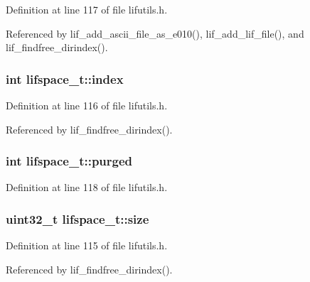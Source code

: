 Definition at line 117 of file lifutils.\+h.



Referenced by lif\+\_\+add\+\_\+ascii\+\_\+file\+\_\+as\+\_\+e010(), lif\+\_\+add\+\_\+lif\+\_\+file(), and lif\+\_\+findfree\+\_\+dirindex().

\subsubsection[{\texorpdfstring{index}{index}}]{\setlength{\rightskip}{0pt plus 5cm}int lifspace\+\_\+t\+::index}\hypertarget{structlifspace__t_abcca3daca009eca56173dc8577d597da}{}\label{structlifspace__t_abcca3daca009eca56173dc8577d597da}


Definition at line 116 of file lifutils.\+h.



Referenced by lif\+\_\+findfree\+\_\+dirindex().

\subsubsection[{\texorpdfstring{purged}{purged}}]{\setlength{\rightskip}{0pt plus 5cm}int lifspace\+\_\+t\+::purged}\hypertarget{structlifspace__t_a53fce276ffb7bb4f8556cc2e7ac76390}{}\label{structlifspace__t_a53fce276ffb7bb4f8556cc2e7ac76390}


Definition at line 118 of file lifutils.\+h.

\subsubsection[{\texorpdfstring{size}{size}}]{\setlength{\rightskip}{0pt plus 5cm}uint32\+\_\+t lifspace\+\_\+t\+::size}\hypertarget{structlifspace__t_a0519f0089ed8694cbb2208364c6b31bd}{}\label{structlifspace__t_a0519f0089ed8694cbb2208364c6b31bd}


Definition at line 115 of file lifutils.\+h.



Referenced by lif\+\_\+findfree\+\_\+dirindex().

